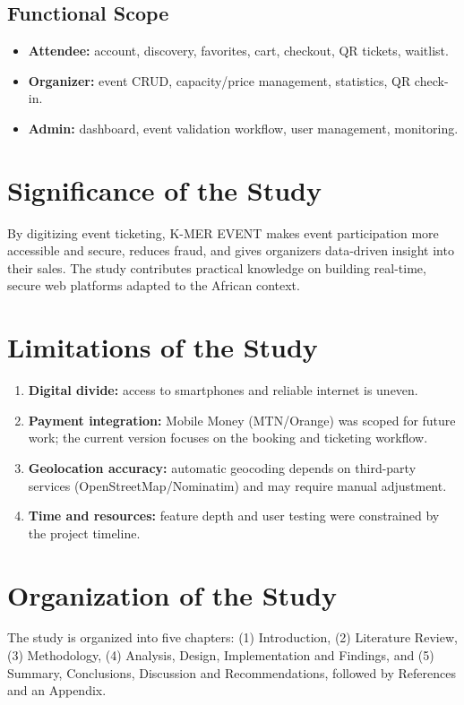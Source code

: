 \documentclass[12pt,a4paper]{report}
\begin{document}
\subsection{Functional Scope}
\begin{itemize}
  \item \textbf{Attendee:} account, discovery, favorites, cart, checkout, QR tickets, waitlist.
  \item \textbf{Organizer:} event CRUD, capacity/price management, statistics, QR check-in.
  \item \textbf{Admin:} dashboard, event validation workflow, user management, monitoring.
\end{itemize}

\section{Significance of the Study}
By digitizing event ticketing, K-MER EVENT makes event participation more accessible and
secure, reduces fraud, and gives organizers data-driven insight into their sales. The study
contributes practical knowledge on building real-time, secure web platforms adapted to the
African context.

\section{Limitations of the Study}
\begin{enumerate}
  \item \textbf{Digital divide:} access to smartphones and reliable internet is uneven.
  \item \textbf{Payment integration:} Mobile Money (MTN/Orange) was scoped for future work;
        the current version focuses on the booking and ticketing workflow.
  \item \textbf{Geolocation accuracy:} automatic geocoding depends on third-party services
        (OpenStreetMap/Nominatim) and may require manual adjustment.
  \item \textbf{Time and resources:} feature depth and user testing were constrained by the
        project timeline.
\end{enumerate}

\section{Organization of the Study}
The study is organized into five chapters: (1) Introduction, (2) Literature Review,
(3) Methodology, (4) Analysis, Design, Implementation and Findings, and (5) Summary,
Conclusions, Discussion and Recommendations, followed by References and an Appendix.
\end{document}
